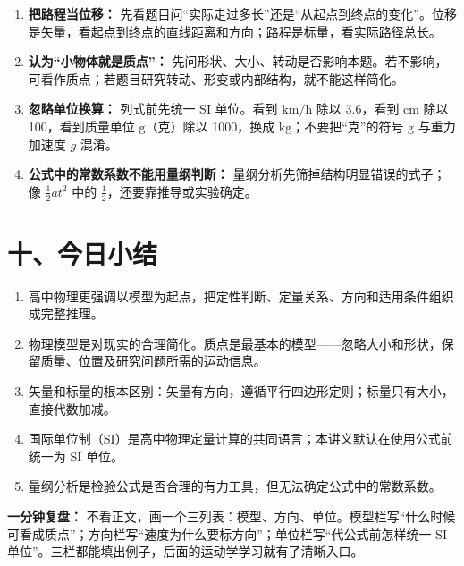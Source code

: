 \begin{mistakebox}
\begin{enumerate}
  \item \textbf{把路程当位移：} 先看题目问“实际走过多长”还是“从起点到终点的变化”。位移是矢量，看起点到终点的直线距离和方向；路程是标量，看实际路径总长。
  \item \textbf{认为“小物体就是质点”：} 先问形状、大小、转动是否影响本题。若不影响，可看作质点；若题目研究转动、形变或内部结构，就不能这样简化。
  \item \textbf{忽略单位换算：} 列式前先统一 SI 单位。看到 $\mathrm{km/h}$ 除以 3.6，看到 $\mathrm{cm}$ 除以 100，看到质量单位 $\mathrm{g}$（克）除以 1000，换成 $\mathrm{kg}$；不要把“克”的符号 $\mathrm{g}$ 与重力加速度 $g$ 混淆。
  \item \textbf{公式中的常数系数不能用量纲判断：} 量纲分析先筛掉结构明显错误的式子；像 $\frac{1}{2}at^2$ 中的 $\frac12$，还要靠推导或实验确定。
\end{enumerate}
\end{mistakebox}

\section*{十、今日小结}

\begin{enumerate}
  \item 高中物理更强调以模型为起点，把定性判断、定量关系、方向和适用条件组织成完整推理。
  \item 物理模型是对现实的合理简化。质点是最基本的模型——忽略大小和形状，保留质量、位置及研究问题所需的运动信息。
  \item 矢量和标量的根本区别：矢量有方向，遵循平行四边形定则；标量只有大小，直接代数加减。
  \item 国际单位制（SI）是高中物理定量计算的共同语言；本讲义默认在使用公式前统一为 SI 单位。
  \item 量纲分析是检验公式是否合理的有力工具，但无法确定公式中的常数系数。
\end{enumerate}

\textbf{一分钟复盘：} 不看正文，画一个三列表：模型、方向、单位。模型栏写“什么时候可看成质点”；方向栏写“速度为什么要标方向”；单位栏写“代公式前怎样统一 SI 单位”。三栏都能填出例子，后面的运动学学习就有了清晰入口。
